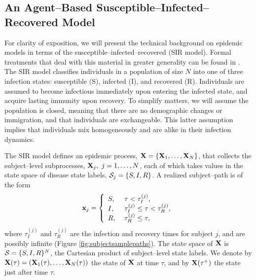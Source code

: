 \subsection{An Agent--Based Susceptible--Infected--Recovered Model}
\label{subsec:sir_individual_mod}
For clarity of exposition, we will present the technical background on epidemic models in terms of the susceptible--infected--recovered (SIR model). Formal treatments that deal with this material in greater generality can be found in \cite{andersson2000stochastic,britton2018,brauer2008compartmental,fuchs2013inference,greenwood2009stochastic,wilkinson2011stochastic}. The SIR model classifies individuals in a population of size $ N $ into one of three infection states: susceptible (S), infected (I), and recovered (R). Individuals are assumed to become infectious immediately upon entering the infected state, and acquire lasting immunity upon recovery. To simplify matters, we will assume the population is closed, meaning that there are no demographic changes or immigration, and that individuals are exchangeable. This latter assumption implies that individuals mix homogeneously and are alike in their infection dynamics. 

The SIR model defines an epidemic process, $ \mathbf{X} = \lbrace\mathbf{X}_1,\dots,\mathbf{X}_N\rbrace $, that collects the subject--level subprocesses, $ \mathbf{X}_j,\ j=1,\dots,N $, each of which takes values in the state space of disease state labels, $ \mathcal{S}_j= \lbrace S,I,R\rbrace $. A realized subject--path is of the form 
\begin{equation}
\mathbf{x}_j = \left \lbrace\begin{array}{ll}
S,\ & \tau < \tau_I^{(j)},\\
I,\ & \tau_I^{(j)}\leq\tau<\tau_R^{(j)},\\
R,\ & \tau_R^{(j)} \leq \tau,
\end{array}\right .
\end{equation}
where $ \tau_I^{(j)} $ and $ \tau_{R}^{(j)} $ are the infection and recovery times for subject $ j $, and are possibly infinite (Figure \ref{fig:subjectsamplepaths}). The state space of $ \mathbf{X} $ is  $ \mathcal{S} = \lbrace S,I,R\rbrace^N $, the Cartesian product of subject--level state labels. We denote by $ \mathbf{X}(\tau) = \left (\mathbf{X}_1(\tau),\dots,\mathbf{X}_N(\tau)\right ) $ the state of $ \mathbf{X} $ at time $ \tau $, and by $ \mathbf{X}(\tau^+) $ the state just after time $ \tau $. 

